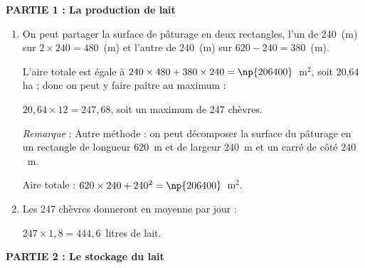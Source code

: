 
\medskip

%
%
\textbf{PARTIE 1 : La production de lait}
%
%
%
%
%
%
%
%
%
%
%

\begin{enumerate}
\item %
On peut partager la surface de pâturage en deux rectangles, l’un de 240~(m) sur $2 \times 240 = 480$~(m) et l’autre de 240~(m) sur $620 - 240 = 380$~(m).

L’aire totale est égale à $240 \times 480 + 380 \times 240 = \np{206400}$~m$^2$, soit 20,64 ha ; donc on peut y faire paître au maximum :

$20,64 \times 12 = 247,68$, soit un maximum de 247 chèvres.

\emph{Remarque} : Autre méthode : on peut décomposer la surface du pâturage en un rectangle de longueur $620$~m et de largeur $240$~m et un carré de côté $240$~m.

Aire totale : $620 \times 240 + 240^2 = \np{206400}$~m$^2$.
\item %
Les 247 chèvres donneront en moyenne par jour :

$247 \times 1,8 = 444,6$~litres de lait.
\end{enumerate}

\bigskip
 
\textbf{PARTIE 2 : Le stockage du lait}
 
\medskip

